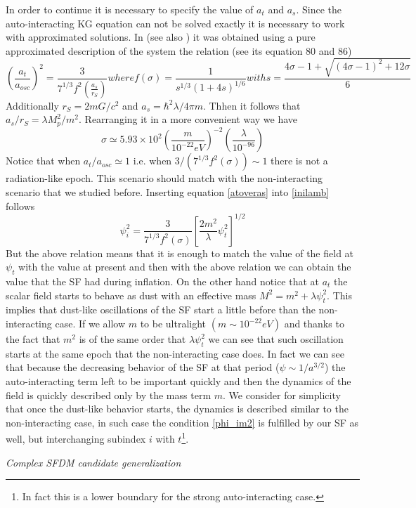 \documentclass[amssymb,twocolumn,prd,nofootinbib,showpacs]{revtex4-1}
\begin{document}
\begin{itemize}
In order to continue it is necessary to specify the value of $a_t$ and $a_s$. Since the auto-interacting KG equation can not be solved exactly it is necessary to work with approximated solutions. In \cite{SFphi42} (see also \cite{SFphi41}) it was obtained using a pure approximated description of the system the relation (see its equation 80 and 86)
\begin{subequations}
\begin{equation}\label{atoveras}
\left(\frac{a_t}{a_{osc}}\right)^2=\frac{3}{7^{1/3}f^2(\frac{a_s}{r_S})}
\end{equation}
where 
\begin{equation}
f(\sigma)=\frac{1}{s^{1/3}(1+4s)^{1/6}}
\end{equation}
with
\begin{equation}
s=\frac{4\sigma-1+\sqrt{(4\sigma-1)^2+12\sigma}}{6}
\end{equation}
\end{subequations}
Additionally $r_S=2mG/c^2$ and $a_s=\hbar^2\lambda/4\pi m$. Thhen it follows that $a_s/r_S=\lambda M_p^2/m^2$. Rearranging it in a more convenient way we have
\begin{equation}
\sigma \simeq 5.93\times 10^{
2}\left(\frac{m}{10^{-22}eV}\right)^{-2}\left(\frac{\lambda}{10^{-96}}\right)
\end{equation}
Notice that when $a_t/a_{osc}\simeq 1$ i.e. when $3/(7^{1/3}f^2(\sigma))\sim 1$ there is not a radiation-like epoch. This scenario should match with the non-interacting scenario that we studied before. Inserting equation \eqref{atoveras} into \eqref{inilamb} follows
\begin{equation}\label{inilamb2}
\psi_i^2=\frac{3}{7^{1/3}f^2(\sigma)}\left[\frac{2m^2}{\lambda}\psi_t^2\right]^{1/2}
\end{equation}
But the above relation means that it is enough to match the value of the field at $\psi_t$ with the value at present and then with the above relation we can obtain the value that the SF had during inflation. On the other hand notice that at $a_t$ the scalar field starts to behave as dust with an effective mass $M^2=m^2+\lambda\psi_t^2$. This implies that dust-like oscillations of the SF start a little before than the non-interacting case. If we allow $m$ to be ultralight $(m\sim 10^{-22}eV)$ and thanks to the fact that $m^2$ is of the same order that $\lambda\psi_t^2$ we can see that such oscillation starts at the same epoch that the non-interacting case does. In fact we can see that because the decreasing behavior of the SF at that period ($\psi\sim 1/a^{3/2}$) the auto-interacting term left to be important quickly and then the dynamics of the field is quickly described only by the mass term $m$. We consider for simplicity that once the dust-like behavior starts, the dynamics is described similar to  the non-interacting case, in such case the condition \eqref{phi_im2} is fulfilled by our SF as well, but interchanging subindex $i$ with $t$\footnote{In fact this is a lower boundary for the strong auto-interacting case.}.
\end{itemize}
\begin{center}
\textit{Complex SFDM candidate generalization}
\end{center}
\end{document}
